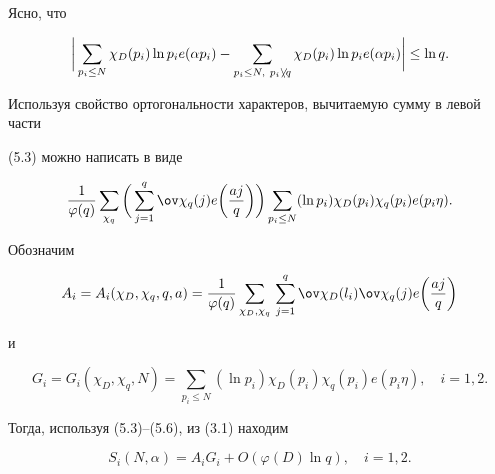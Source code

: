 \begin{pf}


Ясно, что


\begin{equation}


\bigg|\sum_{p_i\le N}\chi_{D} (p_i)\ln p_i e(\alpha p_i) -


\sum_{p_i\le N,\ p_i\not\setminus q}\chi_{D} (p_i)\ln p_i e(\alpha p_i)


\bigg|\le\ln q.


\end{equation}


Используя свойство ортогональности характеров, вычитаемую сумму в левой части


(5.3) можно написать в виде


\begin{equation}


\frac1{\varphi(q)}


\sum_{\chi_q}\bigg(\sum_{j=1}^q {\ov \chi_q}(j) e\bigg(\frac{a j}{q}\bigg)


\bigg)\sum_{p_i\le N}(\ln p_i)\chi_{D}(p_i)\chi_q(p_i) e(p_i\eta).


\end{equation}





Обозначим


\begin{equation}


A_i=A_i(\chi_{D}, \chi_q, q, a)=


\frac1{\varphi(q)}


\sum_{\chi_D, \chi_q}\,\sum_{j=1}^q {\ov \chi_D}(l_i){\ov \chi_q}(j) e


\bigg(\frac{a j}{q}\bigg)


\end{equation}


и


\begin{equation}


G_i=G_i(\chi_D, \chi_q, N)=


\sum_{p_i\le N}(\ln p_i)\chi_D(p_i)\chi_q(p_i) e(p_i\eta),\quad i=1,2.


\end{equation}


Тогда, используя (5.3)--(5.6), из (3.1) находим


\begin{equation}


S_i(N,\alpha) = A_iG_i +O(\varphi(D)\ln q),\quad i=1,2.



\end{equation}
\end{pf}
